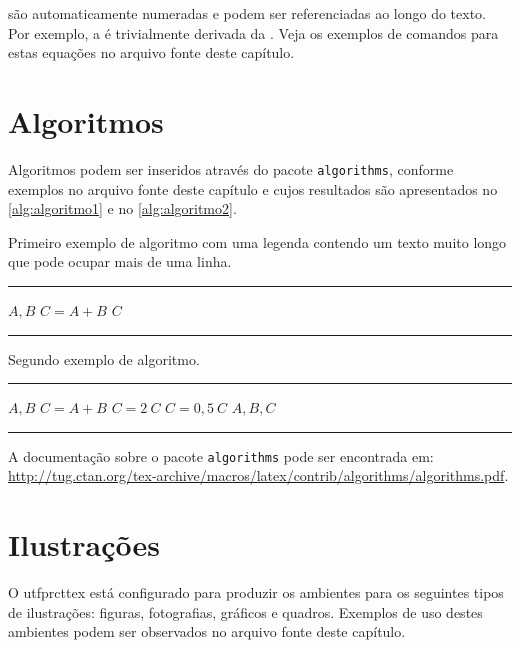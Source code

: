 \noindent são automaticamente numeradas e podem ser referenciadas ao longo do texto. Por exemplo, a  é trivialmente derivada da . Veja os exemplos de comandos para estas equações no arquivo fonte deste capítulo.

\section{Algoritmos}\label{sec:algoritmos}

Algoritmos podem ser inseridos através do pacote \texttt{algorithms}, conforme exemplos no arquivo fonte deste capítulo e cujos resultados são apresentados no \autoref{alg:algoritmo1} e no \autoref{alg:algoritmo2}.

\begin{algorithm}[htb]%
\caption{Primeiro exemplo de algoritmo com uma legenda contendo um texto muito longo que pode ocupar mais de uma linha.}%
\label{alg:algoritmo1}%
\hrule
\begin{algorithmic}[1]%
\ENSURE $A, B$
\STATE $C = A + B$
\PRINT $C$
\end{algorithmic}
\hrule
{}%
\end{algorithm}

\begin{algorithm}[htb]%
\caption{Segundo exemplo de algoritmo.}%
\label{alg:algoritmo2}%
\hrule
\begin{algorithmic}[1]%
\ENSURE $A, B$
\STATE $C = A + B$
\STATE $C = 2 \ C$
\ELSE
\STATE $C = 0,5 \ C$
\ENDIF
\PRINT $A, B, C$
\end{algorithmic}
\hrule
{}%
\end{algorithm}

A documentação sobre o pacote \texttt{algorithms} pode ser encontrada em: \url{http://tug.ctan.org/tex-archive/macros/latex/contrib/algorithms/algorithms.pdf}.

\section{Ilustrações}\label{sec:ilustracoes}

O \gls{utfprcttex} está configurado para produzir os ambientes para os seguintes tipos de ilustrações: figuras, fotografias, gráficos e quadros. Exemplos de uso destes ambientes podem ser observados no arquivo fonte deste capítulo.

